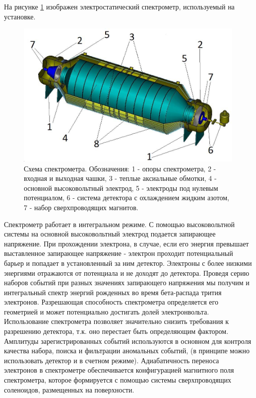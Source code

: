 \documentclass[a4paper,14pt]{extreport}
\begin{document}
На рисунке \ref{fig:numass-spectrometer} изображен электростатический спектрометр, используемый на установке.
\begin{figure}
  \centering
  \includegraphics[width = 0.99\textwidth]{img/nu_mass_setup/spectrometer.jpg}
    \caption{Схема спектрометра. Обозначения: 1 - опоры спектрометра, 2 - входная и выходная чашки, 3 - теплые аксиальные обмотки, 4 - основной высоковольтный электрод, 5 - электроды под нулевым потенциалом, 6 - система детектора с охлаждением жидким азотом, 7 - набор сверхпроводящих магнитов.}
    \label{fig:numass-spectrometer}
\end{figure}
Спектрометр работает в интегральном режиме. С помощью высоковольтной системы на основной высоковольтный электрод подается запирающее напряжение. При прохождении электрона, в случае, если его энергия превышает выставленное запирающее напряжение - электрон проходит потенциальный барьер и попадает в установленный за ним детектор. Электроны с более низкими энергиями отражаются от потенциала и не доходят до детектора. Проведя серию наборов событий при разных значениях запирающего напряжения мы получим и интегральный спектр энергий рожденных во время бета-распада трития электронов. Разрешающая способность спектрометра определяется его геометрией и может потенциально достигать долей электронвольта\cite{katrin-design-report-2004}. Использование спектрометра позволяет значительно снизить требования к разрешению детектора, т.к. оно перестает быть определяющим фактором. Амплитуды зарегистрированных событий используются в основном для контроля качества набора,  поиска и фильтрации аномальных событий, (в принципе можно использовать детектор и в счетном режиме). Адиабатичность переноса электронов в спектрометре обеспечивается конфигурацией магнитного поля спектрометра, которое формируется с помощью системы сверхпроводящих соленоидов, размещенных на поверхности.
\end{document}
